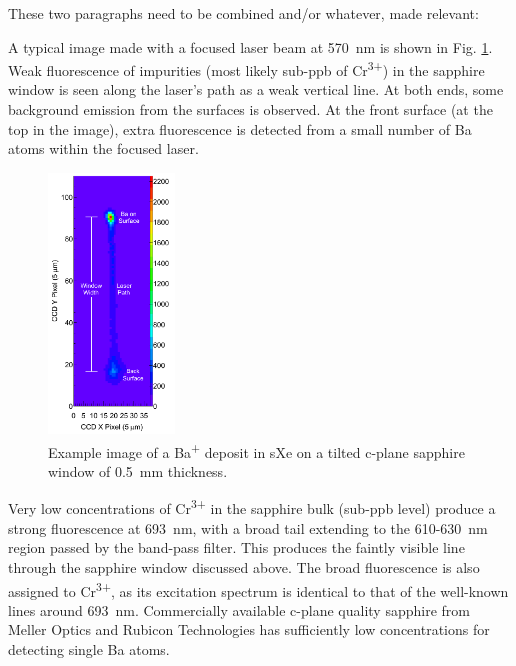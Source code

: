 \documentclass[aps,pra,reprint,superscriptaddress]{revtex4-1}
\begin{document}
{\color{blue}These two paragraphs need to be combined and/or whatever, made relevant:

A typical image made with a focused laser beam at 570~nm is shown in Fig. \ref{fig:image_example}.  Weak fluorescence of impurities (most likely sub-ppb of Cr\textsuperscript{3+}) in the sapphire window is seen along the laser's path as a weak vertical line.  At both ends, some background emission from the surfaces is observed.  At the front surface (at the top in the image), extra fluorescence is detected from a small number of Ba atoms within the focused laser.

\begin{figure}
\includegraphics[width=0.3\textwidth]{figures/imageExamp_fromthesis.png}
\caption{Example image of a Ba\textsuperscript{+} deposit in sXe on a tilted c-plane sapphire window of 0.5~mm thickness.} %
\label{fig:image_example}
\end{figure}

Very low concentrations of Cr\textsuperscript{3+} in the sapphire bulk (sub-ppb level) produce a strong fluorescence at 693~nm, with a broad tail extending to the 610-630~nm region passed by the band-pass filter.  This produces the faintly visible line through the sapphire window discussed above.  The broad fluorescence is also assigned to Cr\textsuperscript{3+}, as its excitation spectrum is identical to that of the well-known lines around 693~nm.  Commercially available c-plane quality sapphire from Meller Optics and Rubicon Technologies has sufficiently low concentrations for detecting single Ba atoms.}
\end{document}
